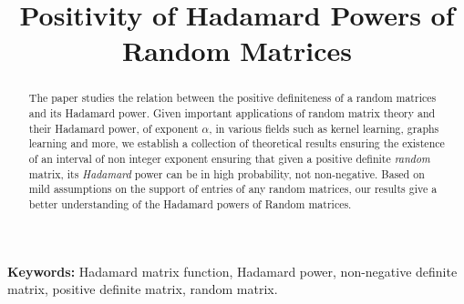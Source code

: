 \documentclass[conference,letterpaper]{IEEEtran}
\numberwithin{equation}{section}
\begin{document}
\title{Positivity of Hadamard Powers of Random Matrices}


\author{%
  \and
}



\maketitle


\begin{abstract}
\noindent The paper studies the relation between the positive definiteness of a random matrices and its Hadamard power.
Given important applications of random matrix theory and their Hadamard power, of exponent $\alpha$, in various fields such as kernel learning, graphs learning and more, we establish a collection of theoretical results ensuring the existence of an interval of non integer exponent ensuring that given a positive definite \emph{random} matrix, its \emph{Hadamard} power can be in high probability, not non-negative.
Based on mild assumptions on the support of entries of any random matrices, our results give a better understanding of the Hadamard powers of Random matrices.
\end{abstract}



\noindent\textbf{Keywords:} Hadamard matrix function, Hadamard power, non-negative definite matrix, positive definite matrix, random matrix.

\medskip
\end{document}
